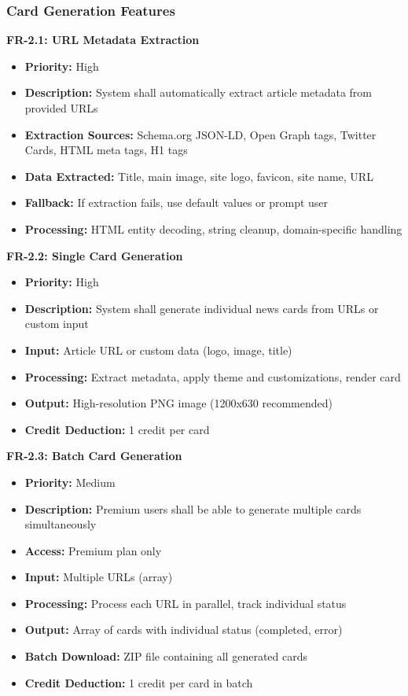 \documentclass[12pt,a4paper]{article}
\begin{document}
\subsubsection{Card Generation Features}

\textbf{FR-2.1: URL Metadata Extraction}
\begin{itemize}
    \item \textbf{Priority:} High
    \item \textbf{Description:} System shall automatically extract article metadata from provided URLs
    \item \textbf{Extraction Sources:} Schema.org JSON-LD, Open Graph tags, Twitter Cards, HTML meta tags, H1 tags
    \item \textbf{Data Extracted:} Title, main image, site logo, favicon, site name, URL
    \item \textbf{Fallback:} If extraction fails, use default values or prompt user
    \item \textbf{Processing:} HTML entity decoding, string cleanup, domain-specific handling
\end{itemize}

\textbf{FR-2.2: Single Card Generation}
\begin{itemize}
    \item \textbf{Priority:} High
    \item \textbf{Description:} System shall generate individual news cards from URLs or custom input
    \item \textbf{Input:} Article URL or custom data (logo, image, title)
    \item \textbf{Processing:} Extract metadata, apply theme and customizations, render card
    \item \textbf{Output:} High-resolution PNG image (1200x630 recommended)
    \item \textbf{Credit Deduction:} 1 credit per card
\end{itemize}

\textbf{FR-2.3: Batch Card Generation}
\begin{itemize}
    \item \textbf{Priority:} Medium
    \item \textbf{Description:} Premium users shall be able to generate multiple cards simultaneously
    \item \textbf{Access:} Premium plan only
    \item \textbf{Input:} Multiple URLs (array)
    \item \textbf{Processing:} Process each URL in parallel, track individual status
    \item \textbf{Output:} Array of cards with individual status (completed, error)
    \item \textbf{Batch Download:} ZIP file containing all generated cards
    \item \textbf{Credit Deduction:} 1 credit per card in batch
\end{itemize}
\end{document}
